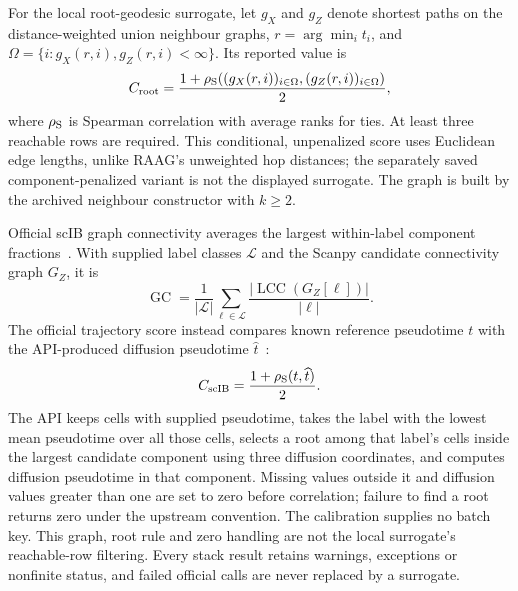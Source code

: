\documentclass[11pt]{article}
\begin{document}
For the local root-geodesic surrogate, let $g_X$ and $g_Z$ denote shortest paths on the distance-weighted union neighbour graphs, $r=\arg\min_i t_i$, and $\Omega=\{i:g_X(r,i),g_Z(r,i)<\infty\}$. Its reported value is
\begin{equation}
 C_{\rm root}=\frac{1+\rho_{\rm S}((g_X(r,i))_{i\in\Omega},(g_Z(r,i))_{i\in\Omega})}{2},
\end{equation}
where $\rho_{\rm S}$ is Spearman correlation with average ranks for ties. At least three reachable rows are required. This conditional, unpenalized score uses Euclidean edge lengths, unlike RAAG's unweighted hop distances; the separately saved component-penalized variant is not the displayed surrogate. The graph is built by the archived neighbour constructor with $k\geq2$.

Official scIB graph connectivity averages the largest within-label component fractions~\cite{scib2025software,luecken2022benchmarking}. With supplied label classes $\mathcal L$ and the Scanpy candidate connectivity graph $G_Z$, it is
\begin{equation}
 \operatorname{GC}=\frac{1}{|\mathcal L|}\sum_{\ell\in\mathcal L}
  \frac{|\operatorname{LCC}(G_Z[\ell])|}{|\ell|}.
\end{equation}
The official trajectory score instead compares known reference pseudotime $t$ with the API-produced diffusion pseudotime $\widehat t$~\cite{scib2025software,haghverdi2016diffusion}:
\begin{equation}
 C_{\rm scIB}=\frac{1+\rho_{\rm S}(t,\widehat t)}{2}.
\end{equation}
The API keeps cells with supplied pseudotime, takes the label with the lowest mean pseudotime over all those cells, selects a root among that label's cells inside the largest candidate component using three diffusion coordinates, and computes diffusion pseudotime in that component. Missing values outside it and diffusion values greater than one are set to zero before correlation; failure to find a root returns zero under the upstream convention. The calibration supplies no batch key. This graph, root rule and zero handling are not the local surrogate's reachable-row filtering. Every stack result retains warnings, exceptions or nonfinite status, and failed official calls are never replaced by a surrogate.
\end{document}
